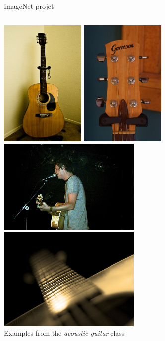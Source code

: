 \documentclass[handout,xcolor=pdftex,dvipsnames,table,mathserif]{beamer}
\begin{document}
\begin{frame}{ImageNet projet}

  \begin{columns}
    \begin{column}{.5\textwidth}
      \centering
      \includegraphics[width=0.31\textwidth]{ilsvrc_guitar2}\hspace{0.1em}
      \includegraphics[width=0.31\textwidth]{ilsvrc_guitar3}\\
      \includegraphics[width=0.52\textwidth]{ilsvrc_guitar1}\\
      \includegraphics[width=0.52\textwidth]{ilsvrc_guitar4}\\
      Examples from the \emph{acoustic guitar} class


\end{column}
\end{columns}
\end{frame}
\end{document}
